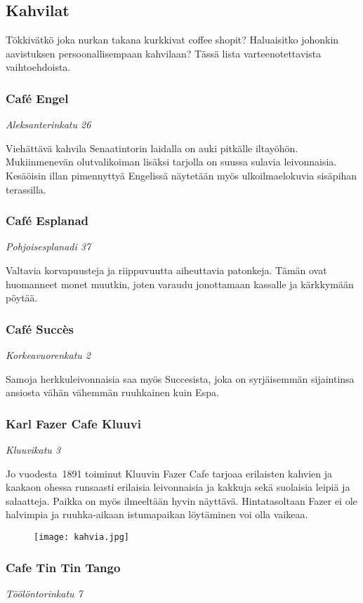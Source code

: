 \documentclass[../ala_hataile.tex]{subfiles}
\begin{document}
\subsection*{Kahvilat}
Tökkivätkö joka nurkan takana kurkkivat
coffee shopit? Haluaisitko johonkin
aavistuksen
persoonallisempaan
kahvilaan? Tässä lista varteenotettavista
vaihtoehdoista.
\subsubsection*{Café Engel}
\textit{Aleksanterinkatu 26}

Viehättävä kahvila Senaatintorin laidalla
on auki pitkälle iltayöhön. Mukiinmenevän
olutvalikoiman lisäksi tarjolla on
suussa sulavia leivonnaisia. Kesäöisin illan
pimennyttyä Engelissä näytetään myös ulkoilmaelokuvia
sisäpihan terassilla.
\subsubsection*{Café Esplanad}
\textit{Pohjoisesplanadi 37}

Valtavia korvapuusteja ja riippuvuutta
aiheuttavia patonkeja. Tämän ovat huomanneet
monet muutkin, joten varaudu jonottamaan
kassalle ja kärkkymään pöytää.
\subsubsection*{Café Succès}
\textit{Korkeavuorenkatu 2}

Samoja herkkuleivonnaisia saa myös
Succesista, joka on syrjäisemmän sijaintinsa
ansiosta vähän vähemmän ruuhkainen
kuin Espa.
\subsubsection*{Karl Fazer Cafe Kluuvi}
\textit{Kluuvikatu 3}

Jo vuodesta~1891 toiminut Kluuvin Fazer
Cafe tarjoaa erilaisten kahvien ja kaakaon
ohessa runsaasti erilaisia leivonnaisia
ja kakkuja sekä suolaisia leipiä ja salaatteja.
Paikka on myös ilmeeltään hyvin näyttävä.
Hintatasoltaan Fazer ei ole halvimpia
ja ruuhka-aikaan istumapaikan löytäminen
voi olla vaikeaa.
\begin{figure}[h!]
	\centering
	\texttt{[image: kahvia.jpg]}
\end{figure}
\subsubsection*{Cafe Tin Tin Tango}
\textit{Töölöntorinkatu 7}
\end{document}
